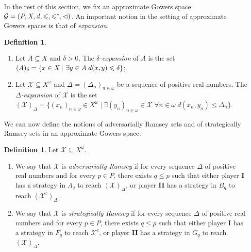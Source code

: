 \documentclass[a4paper,11pt]{article}
\makeatletter
\theoremstyle{definition}
\newtheorem{defin}[thm]{Definition}
\numberwithin{equation}{section}
\newcommand{\X}{\mathcal{X}}
\newcommand{\G}{\mathcal{G}}
\newcommand{\I}{\textbf{I}}
\newcommand{\II}{\textbf{II}}
\newcommand{\alaligne}{~\vspace*{\topsep}\nobreak\@afterheading}
\makeatother
\begin{document}
\smallskip

In the rest of this section, we fix an approximate Gowers space $\G = (P, X, d, \leqslant\nolinebreak, {\leqslant^*}\nolinebreak, {\vartriangleleft} \nolinebreak)$. An important notion in the setting of approximate Gowers spaces is that of \emph{expansion}.

\begin{defin}

\alaligne

\begin{enumerate}

\item Let $A \subseteq X$ and $\delta > 0$. The \emph{$\delta$-expansion} of $A$ is the set $(A)_\delta = \{x \in X \mid \exists y \in \nolinebreak A \; d(x, y) \leqslant \delta\}$;

\item Let $\X \subseteq X^\omega$ and $\Delta = (\Delta_n)_{n \in \omega}$ be a sequence of positive real numbers. The \emph{$\Delta$-expansion} of $\X$ is the set $(\X)_\Delta = \{(x_n)_{n \in \omega} \in X^\omega \mid \exists (y_n)_{n \in \omega} \in \X \; \forall n \in \omega \; d(x_n, y_n) \leqslant \Delta_n\}$.

\end{enumerate}

\end{defin}

We can now define the notions of adversarially Ramsey sets and of strategically Ramsey sets in an approximate Gowers space:

\begin{defin}

Let $\X \subseteq X^\omega$.

\begin{enumerate}

\item We say that $\X$ is \emph{adversarially Ramsey} if for every sequence $\Delta$ of positive real numbers and for every $p \in P$, there exists $q \leqslant p$ such that either player \I{} has a strategy in $A_q$ to reach $(\X)_\Delta$, or player \II{} has a strategy in $B_q$ to reach $(\X^c)_\Delta$.

\item We say that $\X$ is \emph{strategically Ramsey} if for every sequence $\Delta$ of positive real numbers and for every $p \in P$, there exists $q \leqslant p$ such that either player \I{} has a strategy in $F_q$ to reach $\X^c$, or player \II{} has a strategy in $G_q$ to reach $(\X)_\Delta$.

\end{enumerate}

\end{defin}
\end{document}

